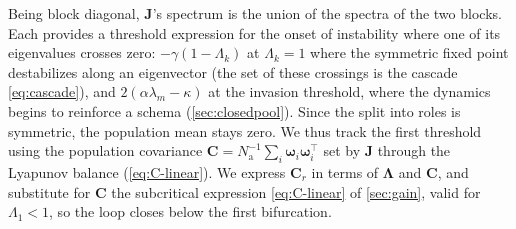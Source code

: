 \documentclass[
  aps,prx,
  reprint,
  superscriptaddress,
  nofootinbib,
  longbibliography
]{revtex4-2}
\newcommand{\w}{\bm{\omega}}
\newcommand{\C}{\mathbf{C}}
\newcommand{\Cr}{\mathbf{C}_r}
\newcommand{\Lam}{\bm{\Lambda}}
\newcommand{\Nag}{N_{\mathrm{a}}}
\begin{document}
Being block diagonal, $\bm{J}$'s spectrum is the union of the spectra of the two blocks. Each provides a threshold expression for the onset of instability where one of its eigenvalues crosses zero: $-\gamma(1-\Lambda_k)$ at $\Lambda_k=1$ where the symmetric fixed point destabilizes along an eigenvector (the set of these crossings is the cascade \cref{eq:cascade}), and $2(\alpha\lambda_m-\kappa)$ at the invasion threshold, where the dynamics begins to reinforce a schema (\cref{sec:closedpool}).
Since the split into roles is symmetric, the population mean stays zero. We thus track the first threshold using the population covariance $\C=\Nag^{-1}\sum_i \w_i\w_i^{\!\top}$ set by $\bm{J}$ through the Lyapunov balance (\cref{eq:C-linear}).
We express $\Cr$ in terms of $\Lam$ and $\C$, and substitute for $\C$ the subcritical expression \cref{eq:C-linear} of \cref{sec:gain}, valid for $\Lambda_1<1$, so the loop closes below the first bifurcation.
\end{document}
